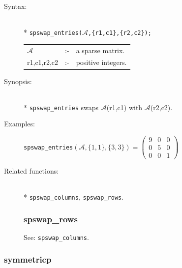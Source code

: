 \begin{description}
\item[Syntax:]\mbox{}\\*
{\tt spswap\_entries($\mathcal{A}$,\{r1,c1\},\{r2,c2\});}\\[2mm]
\begin{tabular}{l l l}
$\mathcal{A}$  &:-& a sparse matrix. \\
r1,c1,r2,c2 &:-& positive integers.
\end{tabular}

\item[Synopsis:]\mbox{}\\*
\texttt{spswap\_entries} swaps $\mathcal{A}$(r1,c1) with
                $\mathcal{A}$(r2,c2).

\item[Examples:]
\texttt{spswap\_entries}\((\mathcal{A},\{1,1\},\{3,3\}) =
        \begin{pmatrix} 9 & 0 & 0 \\ 0 & 5 & 0 \\ 0 & 0 & 1 \end{pmatrix}\)

\item[Related functions:]\mbox{}\\*
\texttt{spswap\_columns}, \texttt{spswap\_rows}.


\subsubsection{spswap\_rows}
\label{sparse:spswap_rows}
\hypertarget{operator:SPSWAP_ROWS}{}
See: \texttt{spswap\_columns}.
\end{description}

\subsubsection{symmetricp}
\label{sparse:symmetricp}

